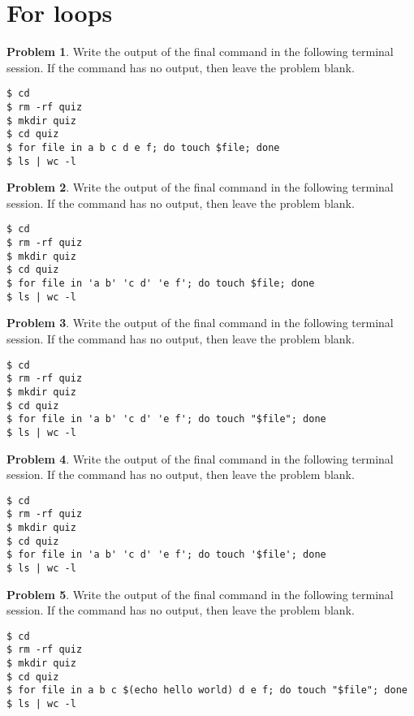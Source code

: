 \documentclass[10pt]{article}
\theoremstyle{definition}
\newtheorem{problem}{Problem}
\begin{document}
\section{For loops}

\begin{problem}
    Write the output of the final command in the following terminal session.
    If the command has no output, then leave the problem blank.
\end{problem}
\begin{lstlisting}
$ cd
$ rm -rf quiz
$ mkdir quiz
$ cd quiz
$ for file in a b c d e f; do touch $file; done
$ ls | wc -l
\end{lstlisting}
\vspace{0.4in}

\begin{problem}
    Write the output of the final command in the following terminal session.
    If the command has no output, then leave the problem blank.
\end{problem}
\begin{lstlisting}
$ cd
$ rm -rf quiz
$ mkdir quiz
$ cd quiz
$ for file in 'a b' 'c d' 'e f'; do touch $file; done
$ ls | wc -l
\end{lstlisting}
\vspace{0.4in}

\begin{problem}
    Write the output of the final command in the following terminal session.
    If the command has no output, then leave the problem blank.
\end{problem}
\begin{lstlisting}
$ cd
$ rm -rf quiz
$ mkdir quiz
$ cd quiz
$ for file in 'a b' 'c d' 'e f'; do touch "$file"; done
$ ls | wc -l
\end{lstlisting}
\vspace{0.4in}

\begin{problem}
    Write the output of the final command in the following terminal session.
    If the command has no output, then leave the problem blank.
\end{problem}
\begin{lstlisting}
$ cd
$ rm -rf quiz
$ mkdir quiz
$ cd quiz
$ for file in 'a b' 'c d' 'e f'; do touch '$file'; done
$ ls | wc -l
\end{lstlisting}
\vspace{0.4in}


\begin{problem}
    Write the output of the final command in the following terminal session.
    If the command has no output, then leave the problem blank.
\end{problem}
\begin{lstlisting}
$ cd
$ rm -rf quiz
$ mkdir quiz
$ cd quiz
$ for file in a b c $(echo hello world) d e f; do touch "$file"; done
$ ls | wc -l
\end{lstlisting}
\vspace{0.4in}
\end{document}
